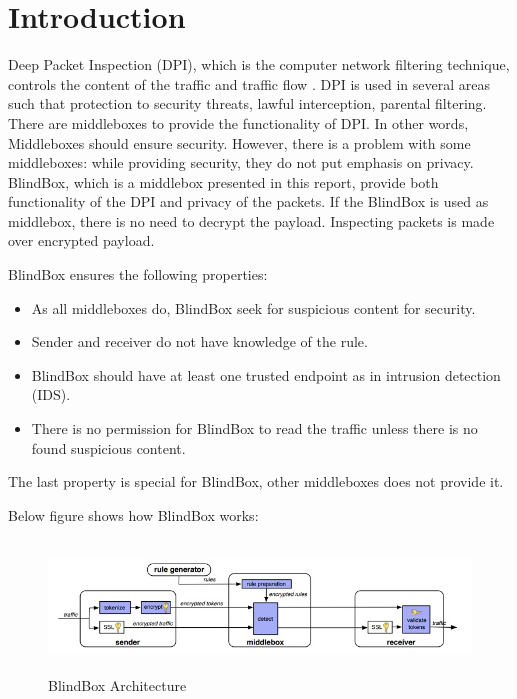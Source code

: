 \documentclass{winslabreport}
\begin{document}
\restoregeometry
\maketitle
\tableofcontents
\listoffigures

\body

\section{Introduction}

Deep Packet Inspection (DPI), which is the computer network filtering technique, controls the content of the traffic and traffic flow \cite{Deep}. DPI is used in several areas such that protection to security threats, lawful interception, parental filtering. There are middleboxes to provide the functionality of DPI. In other words, Middleboxes should ensure security. However, there is a problem with some middleboxes: while providing security, they do not put emphasis on privacy. BlindBox, which is a middlebox presented in this report, provide both functionality of the DPI and privacy of the packets. If the BlindBox is used as middlebox, there is no need to decrypt the payload. Inspecting packets is made over encrypted payload. 

BlindBox ensures the following properties:

\begin{itemize}
	\item As all middleboxes do, BlindBox seek for suspicious content for security. 
	\item Sender and receiver do not have knowledge of the rule.
	\item BlindBox should have at least one trusted endpoint as in intrusion detection (IDS). 
	\item There is no permission for BlindBox to read the traffic unless there is no found suspicious content.
\end{itemize}

The last property is special for BlindBox, other middleboxes does not provide it.

Below figure shows how BlindBox works:

\begin{figure}[H]
	\centering
	\includegraphics[width=150mm,height=35mm]{blindbox.jpg}
	\caption{BlindBox Architecture}
	\label{fig:bli1}
\end{figure}
\end{document}
